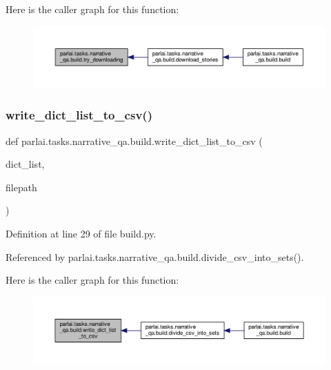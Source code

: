 Here is the caller graph for this function\+:
\nopagebreak
\begin{figure}[H]
\begin{center}
\leavevmode
\includegraphics[width=350pt]{namespaceparlai_1_1tasks_1_1narrative__qa_1_1build_a9af345566fd27c286f7fef146b2cf00b_icgraph}
\end{center}
\end{figure}
\mbox{\label{namespaceparlai_1_1tasks_1_1narrative__qa_1_1build_ab49502ac724edd933f89bec8f414b452}} 
\subsubsection{\texorpdfstring{write\+\_\+dict\+\_\+list\+\_\+to\+\_\+csv()}{write\_dict\_list\_to\_csv()}}
{\footnotesize\ttfamily def parlai.\+tasks.\+narrative\+\_\+qa.\+build.\+write\+\_\+dict\+\_\+list\+\_\+to\+\_\+csv (\begin{DoxyParamCaption}\item[{}]{dict\+\_\+list,  }\item[{}]{filepath }\end{DoxyParamCaption})}



Definition at line 29 of file build.\+py.



Referenced by parlai.\+tasks.\+narrative\+\_\+qa.\+build.\+divide\+\_\+csv\+\_\+into\+\_\+sets().

Here is the caller graph for this function\+:
\nopagebreak
\begin{figure}[H]
\begin{center}
\leavevmode
\includegraphics[width=350pt]{namespaceparlai_1_1tasks_1_1narrative__qa_1_1build_ab49502ac724edd933f89bec8f414b452_icgraph}
\end{center}
\end{figure}


